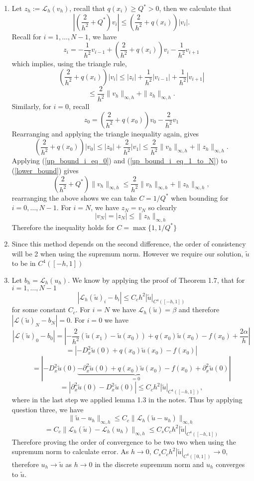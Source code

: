 \documentclass[a4paper,11pt]{article}
\theoremstyle{plain} %
\theoremstyle{definition} %
\theoremstyle{remark} %
\newcommand{\Lc}{\mathcal{L}}
\newcommand{\brac}[1]{\left ( #1  \right )}
\newcommand{\abs}[1]{\left | #1  \right | }
\begin{document}
\begin{enumerate}
\item Let $z_h := \Lc_h(v_h)$, recall that $q(x_i) \geq Q^* > 0$, then we calculate that
\begin{equation} \label{lower_bound}
\abs{ \brac{ \frac{2}{h^2} +Q^*}v_i } \leq \brac{\frac{2}{h^2}+ q(x_i)}|v_i|.
\end{equation}   
Recall for $i = 1, \dotsc, N-1$, we have
\[z_i =  -\frac{1}{h^2} v_{i-1}+\brac{\frac{2}{h^2}+q(x_i)}v_i-\frac{1}{h^2}v_{i+1} \] 
which implies, using the triangle rule,
\[\brac{\frac{2}{h^2}+ q(x_i)}|v_i| \leq |z_i| + \frac{1}{h^2}|v_{i-1}| +  \frac{1}{h^2}|v_{i+1}|\]
\begin{equation} \label{up_bound_i_eq_1_to_N}
\leq \frac{2}{h^2}\|v_h\|_{\infty, h} + \|z_h\|_{\infty,h}.
\end{equation}
Similarly, for $i=0$, recall
\[z_0 = \brac{ \frac{2}{h^2} + q(x_0)}v_0 - \frac{2}{h^2}v_1\]
Rearranging and applying the triangle inequality again, gives
\begin{equation} \label{up_bound_i_eq_0}
\brac{\frac{2}{h^2}+ q(x_0)}|v_0| \leq |z_0| + \frac{2}{h^2}|v_{1}| \leq \frac{2}{h^2}\|v_h\|_{\infty, h} + \|z_h\|_{\infty,h}.
\end{equation} 
Applying (\ref{up_bound_i_eq_0}) and (\ref{up_bound_i_eq_1_to_N}) to (\ref{lower_bound}) gives 
\[\brac{ \frac{2}{h^2}+Q^*}\|v_h\|_{\infty,h} \leq \frac{2}{h^2}\|v_h\|_{\infty, h} + \|z_h\|_{\infty,h}, \]
rearranging the above shows we can take $C = 1/Q^*$ when bounding for $i = 0, \dotsc, N-1$.
For $i = N$, we have $z_N = v_N$ so clearly 
\[|v_N| = |z_N| \leq   \|z_h\|_{\infty,h}\]
Therefore the inequality holds for $C = \max\{1, 1/Q^*\}$
\item Since this method depends on the second difference, the order of consistency will be 2 when using the supremum norm. However we require our solution, $\tilde u$ to be in $C^4([-h,1])$
\item Let $b_h = \Lc_h(u_h)$. We know by applying the proof of Theorem 1.7, that for $i = 1, \dotsc, N-1$
\[|\Lc_h(\tilde u)_i - b_i| \leq C_ch^2| \tilde u |_{C^4([-h,1])} \]
for some constant $C_c$. For $i=N$ we have $\Lc_h(\tilde u) = \beta$ and therefore $|\Lc(\tilde u)_N - b_N| = 0$. For $i=0$ we have
\[|\Lc(\tilde u)_0 - b_0| =  \abs{-\frac{2}{h^2}(\tilde u(x_1)- \tilde u(x_0)) +q(x_0)\tilde u(x_0) - f(x_0) + \frac{2\alpha}{h}} \]
\[= \abs{ -D^2_x \tilde u(0)   +q(x_0)\tilde u(x_0) - f(x_0)}\] 
\[ = | -D^2_x \tilde u(0) \underbrace{-\partial^2_x  \tilde u(0)  +q(x_0)\tilde u(x_0) - f(x_0)}_{=0} + \partial^2_x  \tilde u(0)|\]
\[= \abs{\partial^2_x  \tilde u(0) -D^2_x \tilde u(0) } \leq C_c h^2 | \tilde u |_{C^4([-h,1])}, \] 
where in the last step we applied lemma 1.3 in the notes. Thus by applying question three, we have
\[ \| \tilde u - u_h \|_{\infty,h} \leq  C_c \| \Lc_h (\tilde u - u_h)\|_{\infty,h}\]
\[= C_c \| \Lc_h (\tilde u) - \Lc_h(u_h)\|_{\infty,h} \leq C_sC_c h^2| \tilde u |_{C^4([-h,1])} \]
Therefore proving the order of convergence to be two two when using the supremum norm to calculate error. As $h \to 0$, $C_sC_c h^2| \tilde u |_{C^4([0,1])} \to 0$, therefore $u_h \to \tilde u$ as $h \to 0$ in the discrete supremum norm and $u_h$ converges to $\tilde u$.


\end{enumerate}
\end{document}
